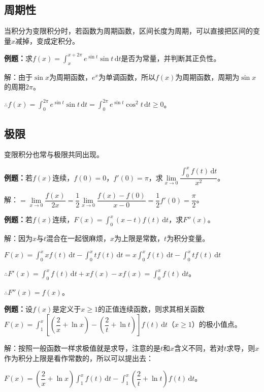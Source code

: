 \documentclass[UTF8, 12pt]{ctexart}
\begin{document}
\subsection{周期性}

当积分为变限积分时，若函数为周期函数，区间长度为周期，可以直接把区间的变量$x$减掉，变成定积分。

\textbf{例题：}求$f(x)=\int_x^{x+2\pi}e^{\sin t}\sin t\,\textrm{d}t$是否为常量，并判断其正负性。

解：由于$\sin x$为周期函数，$e^x$为单调函数，所以$f(x)$为周期函数，周期为$\sin x$的周期$2\pi$。

$\therefore f(x)=\int_0^{2\pi}e^{\sin t}\sin t\,\textrm{d}t=\int_0^{2\pi}e^{\sin t}\cos^2t\,\textrm{d}t\geqslant0$。

\subsection{极限}

变限积分也常与极限共同出现。

\textbf{例题：}若$f(x)$连续，$f(0)=0$，$f'(0)=\pi$，求$\lim\limits_{x\to0}\dfrac{\int_0^xf(t)\,\textrm{d}t}{x^2}$。

解：$=\lim\limits_{x\to0}\dfrac{f(x)}{2x}=\dfrac{1}{2}\lim\limits_{x\to0}\dfrac{f(x)-f(0)}{x-0}=\dfrac{1}{2}f'(0)=\dfrac{\pi}{2}$。

\textbf{例题：}若$f(x)$连续，$F(x)=\int_0^x(x-t)f(t)\,\textrm{d}t$，求$F''(x)$。

解：因为$x$与$t$混合在一起很麻烦，$x$为上限是常数，$t$为积分变量。

$F(x)=\int_0^xxf(t)\,\textrm{d}t-\int_0^xtf(t)\,\textrm{d}t=x\int_0^xf(t)\,\textrm{d}t-\int_0^xtf(t)\,\textrm{d}t$

$\therefore F'(x)=\int_0^xf(t)\,\textrm{d}t+xf(x)-xf(x)=\int_0^xf(t)\,\textrm{d}t$。

$\therefore F''(x)=f(x)$。

\textbf{例题：}设$f(x)$是定义于$x\geqslant1$的正值连续函数，则求其相关函数$F(x)=\displaystyle{\int_1^x\left[\left(\dfrac{2}{x}+\ln x\right)-\left(\dfrac{2}{t}+\ln t\right)\right]f(t)\,\textrm{d}t}$（$x\geqslant1$）的极小值点。\medskip

解：按照一般函数一样求极值就是求导，注意的是$t$和$x$含义不同，若对$t$求导，则$x$作为积分上限是看作常数的，所以可以提出去：

$F(x)=\left(\dfrac{2}{x}+\ln x\right)\displaystyle{\int_1^xf(t)\,\textrm{d}t-\int_1^x\left(\dfrac{2}{t}+\ln t\right)f(t)\,\textrm{d}t}$。
\end{document}
